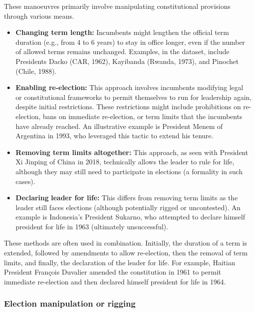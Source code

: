\documentclass[
  12pt,
]{report}
\begin{document}
These manoeuvres primarily involve manipulating constitutional
provisions through various means.

\begin{itemize}
\item
  \textbf{Changing term length:} Incumbents might lengthen the official
  term duration (e.g., from 4 to 6 years) to stay in office longer, even
  if the number of allowed terms remains unchanged. Examples, in the
  dataset, include Presidents Dacko (CAR, 1962), Kayibanda (Rwanda,
  1973), and Pinochet (Chile, 1988).
\item
  \textbf{Enabling re-election:} This approach involves incumbents
  modifying legal or constitutional frameworks to permit themselves to
  run for leadership again, despite initial restrictions. These
  restrictions might include prohibitions on re-election, bans on
  immediate re-election, or term limits that the incumbents have already
  reached. An illustrative example is President Menem of Argentina in
  1993, who leveraged this tactic to extend his tenure.
\item
  \textbf{Removing term limits altogether:} This approach, as seen with
  President Xi Jinping of China in 2018, technically allows the leader
  to rule for life, although they may still need to participate in
  elections (a formality in such cases).
\item
  \textbf{Declaring} \textbf{leader for life:} This differs from
  removing term limits as the leader still faces elections (although
  potentially rigged or uncontested). An example is Indonesia's
  President Sukarno, who attempted to declare himself president for life
  in 1963 (ultimately unsuccessful).
\end{itemize}

These methods are often used in combination. Initially, the duration of
a term is extended, followed by amendments to allow re-election, then
the removal of term limits, and finally, the declaration of the leader
for life. For example, Haitian President François Duvalier amended the
constitution in 1961 to permit immediate re-election and then declared
himself president for life in 1964.

\subsubsection*{Election manipulation or
rigging}\label{election-manipulation-or-rigging}
\end{document}
